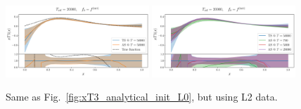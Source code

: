 \begin{figure}[ht!]
  \centering
  \includegraphics[width=0.48\textwidth]{plots/analytical_solution/evolution/evolution_epoch_50000_L2.pdf}
    \includegraphics[width=0.48\textwidth]{plots/analytical_solution/evolution/evolution_epochs_700_5000_20000_L2.pdf}
  \caption{Same as Fig.~\ref{fig:xT3_analytical_init_L0}, but using L2 data.}
  \label{fig:xT3_analytical_init_L2}
\end{figure}


